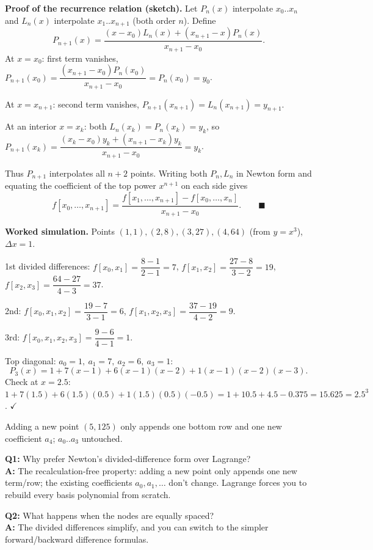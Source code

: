 \begin{examplebox}
\textbf{Proof of the recurrence relation (sketch).} Let $P_n(x)$ interpolate $x_0..x_n$ and $L_n(x)$ interpolate $x_1..x_{n+1}$ (both order $n$). Define
\[
P_{n+1}(x) = \frac{(x-x_0)L_n(x) + (x_{n+1}-x)P_n(x)}{x_{n+1}-x_0}.
\]
At $x=x_0$: first term vanishes, $P_{n+1}(x_0) = \dfrac{(x_{n+1}-x_0)P_n(x_0)}{x_{n+1}-x_0} = P_n(x_0)=y_0$.

At $x=x_{n+1}$: second term vanishes, $P_{n+1}(x_{n+1})=L_n(x_{n+1})=y_{n+1}$.

At an interior $x=x_k$: both $L_n(x_k)=P_n(x_k)=y_k$, so $P_{n+1}(x_k) = \dfrac{(x_k-x_0)y_k+(x_{n+1}-x_k)y_k}{x_{n+1}-x_0} = y_k$.

Thus $P_{n+1}$ interpolates all $n+2$ points. Writing both $P_n,L_n$ in Newton form and equating the coefficient of the top power $x^{n+1}$ on each side gives
\[
f[x_0,\dots,x_{n+1}] = \frac{f[x_1,\dots,x_{n+1}]-f[x_0,\dots,x_n]}{x_{n+1}-x_0}. \qquad\blacksquare
\]
\end{examplebox}

\begin{examplebox}
\textbf{Worked simulation.} Points $(1,1),(2,8),(3,27),(4,64)$ (from $y=x^3$), $\Delta x=1$.

1st divided differences: $f[x_0,x_1]=\dfrac{8-1}{2-1}=7$, $f[x_1,x_2]=\dfrac{27-8}{3-2}=19$, $f[x_2,x_3]=\dfrac{64-27}{4-3}=37$.

2nd: $f[x_0,x_1,x_2]=\dfrac{19-7}{3-1}=6$, $f[x_1,x_2,x_3]=\dfrac{37-19}{4-2}=9$.

3rd: $f[x_0,x_1,x_2,x_3]=\dfrac{9-6}{4-1}=1$.

Top diagonal: $a_0=1,\ a_1=7,\ a_2=6,\ a_3=1$:
\[
P_3(x) = 1+7(x-1)+6(x-1)(x-2)+1(x-1)(x-2)(x-3).
\]
Check at $x=2.5$: $1+7(1.5)+6(1.5)(0.5)+1(1.5)(0.5)(-0.5) = 1+10.5+4.5-0.375=15.625 = 2.5^3$. $\checkmark$

Adding a new point $(5,125)$ only appends one bottom row and one new coefficient $a_4$; $a_0..a_3$ untouched.
\end{examplebox}

\begin{qabox}
\textbf{Q1:} Why prefer Newton's divided-difference form over Lagrange? \\
\textbf{A:} The recalculation-free property: adding a new point only appends one new term/row; the existing coefficients $a_0,a_1,\dots$ don't change. Lagrange forces you to rebuild every basis polynomial from scratch.

\textbf{Q2:} What happens when the nodes are equally spaced? \\
\textbf{A:} The divided differences simplify, and you can switch to the simpler forward/backward difference formulas.
\end{qabox}

